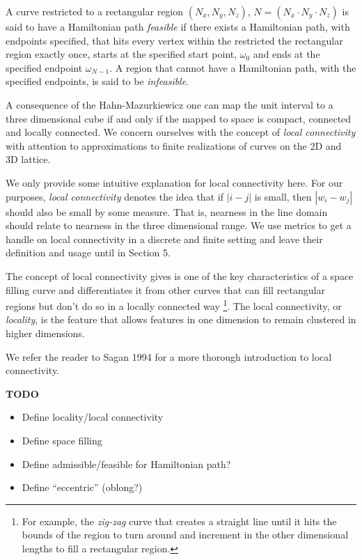 A curve restricted to a rectangular region $( N _ x, N _ y, N _ z)$,  $N = (N _ x \cdot N _ y \cdot N _ z)$
is said to have a Hamiltonian path \textit{feasible} if there exists a Hamiltonian path, with endpoints specified,
that hits every vertex within the restricted the rectangular region exactly once, starts at the specified start
point, $\omega_0$ and ends at the specified endpoint $\omega_{N-1}$.
A region that cannot have a Hamiltonian path, with the specified endpoints, is said to be \textit{infeasible}.

A consequence of the Hahn-Mazurkiewicz \cite{sagan_1994} one can map the unit interval to a three dimensional
cube if and only if the mapped to space is compact, connected and locally connected.
We concern ourselves with the concept of \textit{local connectivity} with attention to approximations
to finite realizations of curves on the 2D and 3D lattice.

We only provide some intuitive explanation for local connectivity here.
For our purposes, \textit{local connectivity} denotes the idea that if $|i-j|$ is small, then $|w_i - w_j|$
should also be small by some measure.
That is, nearness in the line domain should relate to nearness in the three dimensional range.
We use metrics to get a handle on local connectivity in a discrete and finite setting and leave
their definition and usage until in Section 5.

The concept of local connectivity gives is one of the key characteristics of a space filling curve
and differentiates it from other curves that can fill rectangular regions but don't do so in a
locally connected way \footnote{For example, the \textit{zig-zag} curve that creates a straight line until
it hits the bounds of the region to turn around and increment in the other dimensional lengths to fill 
a rectangular region.}.
The local connectivity, or \textit{locality}, is the feature that allows features in one dimension to
remain clustered in higher dimensions.

We refer the reader to Sagan 1994 \cite{sagan_1994} for a more thorough introduction to local connectivity.






\textbf{TODO}

\begin{itemize}
  \item Define locality/local connectivity
  \item Define space filling
  \item Define admissible/feasible for Hamiltonian path?
  \item Define ``eccentric'' (oblong?)
\end{itemize}


